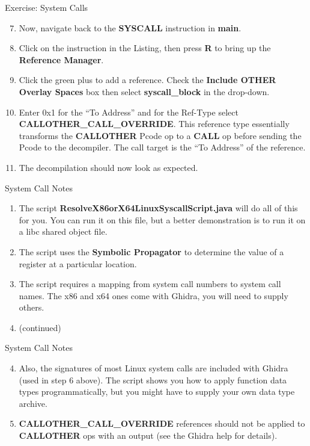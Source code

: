 \documentclass{beamer}
\begin{document}
\begin{frame}
\begin{block}{Exercise: System Calls}
\begin{enumerate}
\setcounter{enumi}{6}
\item Now, navigate back to the \textbf{SYSCALL} instruction in \textbf{main}. 
\item Click on the instruction in the Listing, then press \textbf{R} to bring up the \textbf{Reference Manager}.
\item Click the green plus to add a reference. Check the \textbf{Include OTHER Overlay Spaces} box then select \textbf{syscall\_block} in the drop-down. 
\item Enter 0x1 for the ``To Address'' and for the Ref-Type select \textbf{CALLOTHER\_CALL\_OVERRIDE}. This reference type essentially transforms the \textbf{CALLOTHER} Pcode op to a \textbf{CALL} op before sending the Pcode to the decompiler.  The call target is the ``To Address''
of the reference.
\item[] The decompilation should now look as expected.
\end{enumerate}
\end{block}
\end{frame}

\begin{frame}
\begin{block}{System Call Notes}
\begin{enumerate}
\item The script \textbf{ResolveX86orX64LinuxSyscallScript.java} will do all of this for you. You can run it on this file, but a better demonstration is to run it on a 
libc shared object file.
\item The script uses the \textbf{Symbolic Propagator} to determine the value of a register at a particular location.
\item The script requires a mapping from system call numbers to system call names.  The x86 and x64 ones come with Ghidra, you will need to supply others.
\item[] (continued)
\end{enumerate}
\end{block}
\end{frame}

\begin{frame}
\begin{block}{System Call Notes}
\begin{enumerate}
\setcounter{enumi}{3}
\item Also, the signatures of most Linux system calls are included with Ghidra (used in step 6 above).  The script shows you how to apply function data types programmatically,
but you might have to supply your own data type archive.
\item \textbf{CALLOTHER\_CALL\_OVERRIDE} references should not be applied to \textbf{CALLOTHER} ops with an output (see the Ghidra help for details).
\end{enumerate}
\end{block}
\end{frame}
\end{document}
